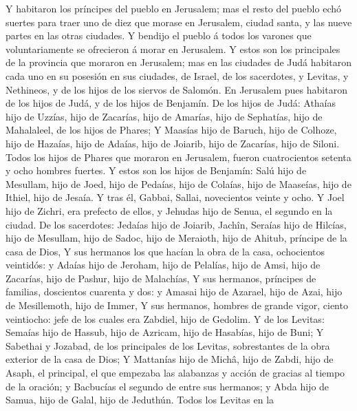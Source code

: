  Y habitaron los príncipes del pueblo en Jerusalem; mas el
resto del pueblo echó suertes para traer uno de diez que morase en
Jerusalem, ciudad santa, y las nueve partes en las otras ciudades.
 Y bendijo el pueblo á todos los varones que
voluntariamente se ofrecieron á morar en Jerusalem.  Y
estos son los principales de la provincia que moraron en Jerusalem; mas
en las ciudades de Judá habitaron cada uno en su posesión en sus
ciudades, de Israel, de los sacerdotes, y Levitas, y Nethineos, y de los
hijos de los siervos de Salomón.  En Jerusalem pues
habitaron de los hijos de Judá, y de los hijos de Benjamín. De los hijos
de Judá: Athaías hijo de Uzzías, hijo de Zacarías, hijo de Amarías, hijo
de Sephatías, hijo de Mahalaleel, de los hijos de Phares; 
Y Maasías hijo de Baruch, hijo de Colhoze, hijo de Hazaías, hijo de
Adaías, hijo de Joiarib, hijo de Zacarías, hijo de Siloni.
 Todos los hijos de Phares que moraron en Jerusalem,
fueron cuatrocientos setenta y ocho hombres fuertes.  Y
estos son los hijos de Benjamín: Salú hijo de Mesullam, hijo de Joed,
hijo de Pedaías, hijo de Colaías, hijo de Maaseías, hijo de Ithiel, hijo
de Jesaía.  Y tras él, Gabbai, Sallai, novecientos veinte
y ocho.  Y Joel hijo de Zichri, era prefecto de ellos, y
Jehudas hijo de Senua, el segundo en la ciudad.  De los
sacerdotes: Jedaías hijo de Joiarib, Jachîn,  Seraías
hijo de Hilcías, hijo de Mesullam, hijo de Sadoc, hijo de Meraioth, hijo
de Ahitub, príncipe de la casa de Dios,  Y sus hermanos
los que hacían la obra de la casa, ochocientos veintidós: y Adaías hijo
de Jeroham, hijo de Pelalías, hijo de Amsi, hijo de Zacarías, hijo de
Pashur, hijo de Malachías,  Y sus hermanos, príncipes de
familias, doscientos cuarenta y dos: y Amasai hijo de Azarael, hijo de
Azai, hijo de Mesillemoth, hijo de Immer,  Y sus
hermanos, hombres de grande vigor, ciento veintiocho: jefe de los cuales
era Zabdiel, hijo de Gedolim.  Y de los Levitas: Semaías
hijo de Hassub, hijo de Azricam, hijo de Hasabías, hijo de Buni;
 Y Sabethai y Jozabad, de los principales de los Levitas,
sobrestantes de la obra exterior de la casa de Dios;  Y
Mattanías hijo de Michâ, hijo de Zabdi, hijo de Asaph, el principal, el
que empezaba las alabanzas y acción de gracias al tiempo de la oración;
y Bacbucías el segundo de entre sus hermanos; y Abda hijo de Samua, hijo
de Galal, hijo de Jeduthún.  Todos los Levitas en la
